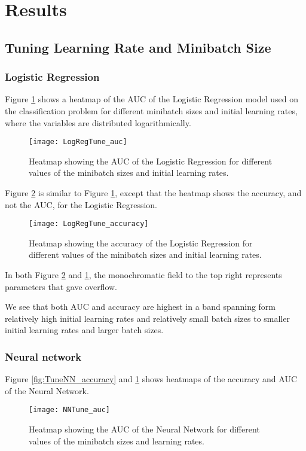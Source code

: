 \section{Results}
\label{sec:results}

\subsection{Tuning Learning Rate and Minibatch Size}

\subsubsection*{Logistic Regression}
Figure \ref{fig:TuneLogReg_auc} shows a heatmap of the AUC of the Logistic Regression model used on the classification problem for different minibatch sizes and initial learning rates, where the variables are distributed logarithmically.
\begin{figure}[htbp]
	\centering
	\texttt{[image: LogRegTune\_auc]}
	\caption{Heatmap showing the AUC of the Logistic Regression for different
		values of the minibatch sizes and initial learning rates.}
	\label{fig:TuneLogReg_auc}
\end{figure}

Figure \ref{fig:TuneLogReg_accuracy} is similar to Figure \ref{fig:TuneLogReg_auc}, except that the heatmap shows the accuracy, and not the AUC, for the Logistic Regression.
\begin{figure}[htbp]
	\centering
	\texttt{[image: LogRegTune\_accuracy]}
	\caption{Heatmap showing the accuracy of the Logistic Regression for different values of the minibatch sizes and initial learning rates.}
	\label{fig:TuneLogReg_accuracy}
\end{figure}

In both Figure \ref{fig:TuneLogReg_accuracy} and \ref{fig:TuneLogReg_auc}, the monochromatic field to the top right represents parameters that gave overflow.

We see that both AUC and accuracy are highest in a band spanning form relatively high initial learning rates and relatively small batch sizes to smaller initial learning rates and larger batch sizes.

\subsubsection*{Neural network}
Figure \ref{fig:TuneNN_accuracy} and \ref{fig:TuneLogReg_auc} shows heatmaps of the accuracy and AUC of the Neural Network.
\begin{figure}[htbp]
	\centering
	\texttt{[image: NNTune\_auc]}
	\caption{Heatmap showing the AUC of the Neural Network for different
		values of the minibatch sizes and learning rates.}
	\label{fig:TuneNN_auc}
\end{figure}

